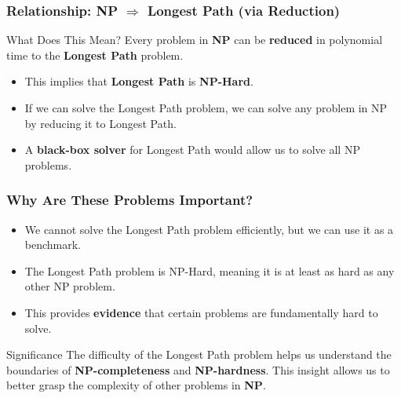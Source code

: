 
\begin{frame}
    \frametitle{Relationship: NP $\Rightarrow$ Longest Path (via Reduction)}

    \begin{block}{What Does This Mean?}
        Every problem in \textbf{NP} can be \textbf{reduced} in polynomial time to the \textbf{Longest Path} problem.
    \end{block}

    \vspace{0.5em}

    \begin{itemize}
        \item This implies that \textbf{Longest Path} is \textbf{NP-Hard}.
        \item If we can solve the Longest Path problem, we can solve any problem in NP by reducing it to Longest Path.
        \item A \textbf{black-box solver} for Longest Path would allow us to solve all NP problems.
    \end{itemize}
\end{frame}


\begin{frame}
    \frametitle{Why Are These Problems Important?}
    \begin{itemize}
        \item We cannot solve the Longest Path problem efficiently, but we can use it as a benchmark.
        \item The Longest Path problem is NP-Hard, meaning it is at least as hard as any other NP problem.
        \item This provides \textbf{evidence} that certain problems are fundamentally hard to solve.
    \end{itemize}

    \vspace{0.5em}

    \begin{block}{Significance}
        The difficulty of the Longest Path problem helps us understand the boundaries of \textbf{NP-completeness} and \textbf{NP-hardness}.
        This insight allows us to better grasp the complexity of other problems in \textbf{NP}.
    \end{block}
\end{frame}



